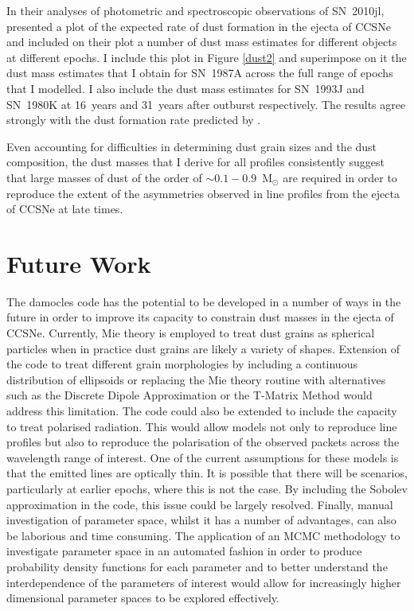 In their analyses of photometric and spectroscopic observations of SN~2010jl, \citet{Gall2014} presented a plot of the expected rate of dust formation in the ejecta of CCSNe and included on their plot a number of dust mass estimates for different objects at different epochs.  I include this plot in Figure \ref{dust2} and superimpose on it the dust mass estimates that I obtain for SN~1987A across the full range of epochs that I modelled. I also include the dust mass estimates for SN~1993J and SN~1980K at 16~years and 31~years after outburst respectively.  The results agree strongly with the dust formation rate predicted by \citet{Gall2014}.

Even accounting for difficulties in determining dust grain sizes and the dust composition, the dust masses that I derive for all profiles consistently suggest that large masses of dust of the order of $\sim0.1-0.9$~M$_{\odot}$ are required in order to reproduce the extent of the asymmetries observed in  line profiles from the ejecta of CCSNe at late times.  

\section{Future Work}

The {\sc damocles} code has the potential to be developed in a number of ways in the future in order to improve its capacity to constrain dust masses in the ejecta of CCSNe.  Currently, Mie theory is employed to treat dust grains as spherical particles when in practice dust grains are likely a variety of shapes.  Extension of the code to treat different grain morphologies by including a continuous distribution of ellipsoids or replacing the Mie theory routine with alternatives such as the Discrete Dipole Approximation or the T-Matrix Method would address this limitation. The code could also be extended to include the capacity to treat polarised radiation.  This would allow models not only to reproduce line profiles but also to reproduce the polarisation of the observed packets across the wavelength range of interest.  One of the current assumptions for these models is that the emitted lines are optically thin.  It is possible that there will be scenarios, particularly at earlier epochs, where this is not the case.  By including the Sobolev approximation \citep{Sobolev1957} in the code, this issue could be largely resolved.  Finally, manual investigation of parameter space, whilst it has a number of advantages, can also be laborious and time consuming.  The application of an MCMC methodology to investigate parameter space in an automated fashion in order to produce probability density functions for each parameter and to better understand the interdependence of the parameters of interest would allow for increasingly higher dimensional parameter spaces to be explored effectively.

